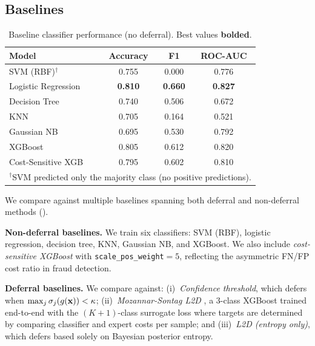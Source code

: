 \subsection{Baselines}
\label{sec:exp_baselines}
\vspace{-0.5em}
\begin{table}[H]
\caption{Baseline classifier performance (no deferral). Best values \textbf{bolded}.}
\label{tab:baselines}
\begin{center}
\begin{small}
\begin{tabular}{lccc}
\toprule
Model & Accuracy & F1 & ROC-AUC \\
\midrule
SVM (RBF)$^\dagger$   & 0.755 & 0.000 & 0.776 \\
Logistic Regression   & \textbf{0.810} & \textbf{0.660} & \textbf{0.827} \\
Decision Tree         & 0.740 & 0.506 & 0.672 \\
KNN                   & 0.705 & 0.164 & 0.521 \\
Gaussian NB           & 0.695 & 0.530 & 0.792 \\
XGBoost               & 0.805 & 0.612 & 0.820 \\
Cost-Sensitive XGB    & 0.795 & 0.602 & 0.810 \\
\bottomrule
\multicolumn{4}{l}{\footnotesize $^\dagger$SVM predicted only the majority class (no positive predictions).}
\end{tabular}
\end{small}
\end{center}
\vskip -0.1in
\end{table}
We compare against multiple baselines spanning both deferral and non-deferral methods ().

\textbf{Non-deferral baselines.} We train six classifiers: SVM (RBF), logistic regression, decision tree, KNN, Gaussian NB, and XGBoost. We also include \textit{cost-sensitive XGBoost} with \texttt{scale\_pos\_weight}$= 5$, reflecting the asymmetric FN/FP cost ratio in fraud detection.

\textbf{Deferral baselines.} We compare against: (i)~\textit{Confidence threshold}, which defers when $\max_j \sigma_j(g(\mathbf{x})) < \kappa$; (ii)~\textit{Mozannar-Sontag L2D} \citep{mozannar2020consistent}, a 3-class XGBoost trained end-to-end with the $(K{+}1)$-class surrogate loss where targets are determined by comparing classifier and expert costs per sample; and (iii)~\textit{L2D (entropy only)}, which defers based solely on Bayesian posterior entropy.


